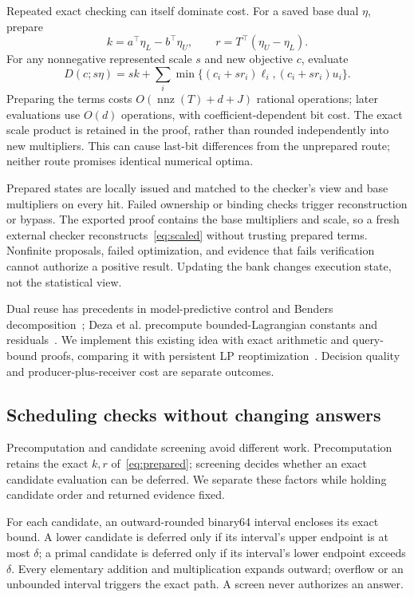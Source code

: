 \documentclass[conference]{IEEEtran}
\begin{document}
Repeated exact checking can itself dominate cost. For a saved base dual $\eta$, prepare
\begin{equation}
 k=a^\top\eta_L-b^\top\eta_U,\qquad
 r=T^\top(\eta_U-\eta_L).\label{eq:prepared}
\end{equation}
For any nonnegative represented scale $s$ and new objective $c$, evaluate
\begin{equation}
 D(c;s\eta)=sk+\sum_i\min\{(c_i+sr_i)\ell_i,(c_i+sr_i)u_i\}.\label{eq:scaled}
\end{equation}
Preparing the terms costs $O(\operatorname{nnz}(T)+d+J)$ rational operations; later evaluations use $O(d)$ operations, with coefficient-dependent bit cost. The exact scale product is retained in the proof, rather than rounded independently into new multipliers. This can cause last-bit differences from the unprepared route; neither route promises identical numerical optima.

Prepared states are locally issued and matched to the checker's view and base multipliers on every hit. Failed ownership or binding checks trigger reconstruction or bypass. The exported proof contains the base multipliers and scale, so a fresh external checker reconstructs~\eqref{eq:scaled} without trusting prepared terms. Nonfinite proposals, failed optimization, and evidence that fails verification cannot authorize a positive result. Updating the bank changes execution state, not the statistical view.

Dual reuse has precedents in model-predictive control and Benders decomposition~\cite{Marcucci2021WarmStart,Kothari2026BendersReuse}; Deza et al. precompute bounded-Lagrangian constants and residuals~\cite{Deza2026MIPSensitivity}. We implement this existing idea with exact arithmetic and query-bound proofs, comparing it with persistent LP reoptimization~\cite{HiGHSHotStart2026}. Decision quality and producer-plus-receiver cost are separate outcomes.

\subsection{Scheduling checks without changing answers}\label{sec:scheduling}
Precomputation and candidate screening avoid different work. Precomputation retains the exact $k,r$ of~\eqref{eq:prepared}; screening decides whether an exact candidate evaluation can be deferred. We separate these factors while holding candidate order and returned evidence fixed.

For each candidate, an outward-rounded binary64 interval encloses its exact bound. A lower candidate is deferred only if its interval's upper endpoint is at most $\delta$; a primal candidate is deferred only if its interval's lower endpoint exceeds $\delta$. Every elementary addition and multiplication expands outward; overflow or an unbounded interval triggers the exact path. A screen never authorizes an answer.
\end{document}
